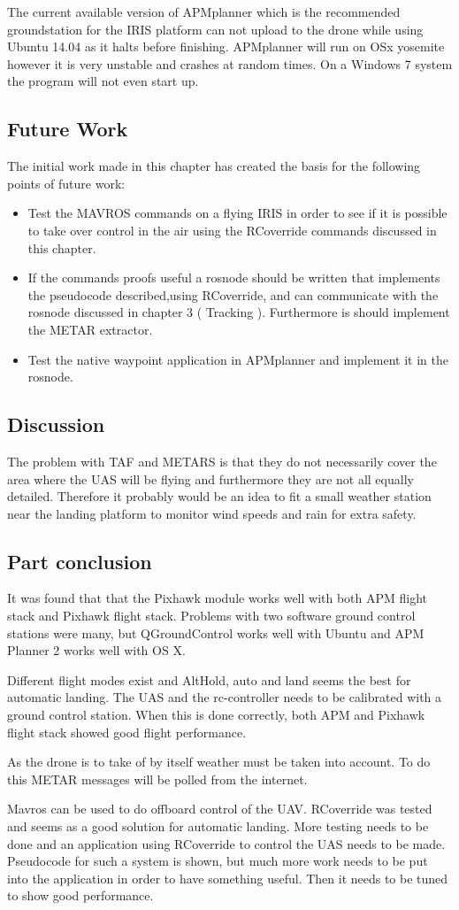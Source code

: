 The current available version of APMplanner which is the recommended groundstation for the IRIS platform can not upload to the drone while using Ubuntu 14.04 as it halts before finishing. APMplanner will run on OSx yosemite however it is very unstable and crashes at random times. On a Windows 7 system the program will not even start up.

\subsection{Future Work}
The initial work made in this chapter has created the basis for the following points of future work: 
\begin{itemize}
\item Test the MAVROS commands on a flying IRIS in order to see if it is possible to take over control in the air using the RCoverride commands discussed in this chapter.
\item If the commands proofs useful a rosnode should be written that implements the pseudocode described,using RCoverride, and can communicate with the rosnode discussed in chapter 3 ( Tracking ). Furthermore is should implement the METAR extractor.
\item Test the native waypoint application in APMplanner and implement it in the rosnode.
\end{itemize}
\subsection{Discussion}
The problem with TAF and METARS is that they do not necessarily cover the area where the UAS will be flying and furthermore they are not all equally detailed. Therefore it probably would be an idea to fit a small weather station near the landing platform to monitor wind speeds and rain for extra safety. 
\subsection{Part conclusion}
It was found that that the Pixhawk module works well with both APM flight stack and Pixhawk flight stack. Problems with two software ground control stations were many, but QGroundControl works well with Ubuntu and APM Planner 2 works well with OS X.

Different flight modes exist and AltHold, auto and land seems the best for automatic landing. The UAS and the rc-controller needs to be calibrated with a ground control station. When this is done correctly, both APM and Pixhawk flight stack showed good flight performance.

As the drone is to take of by itself weather must be taken into account. To do this METAR messages will be polled from the internet. 

Mavros can be used to do offboard control of the UAV. RCoverride was tested and seems as a good solution for automatic landing. More testing needs to be done and an application using RCoverride to control the UAS needs to be made. 
Pseudocode for such a system is shown, but much more work needs to be put into the application in order to have something useful. Then it needs to be tuned to show good performance.
